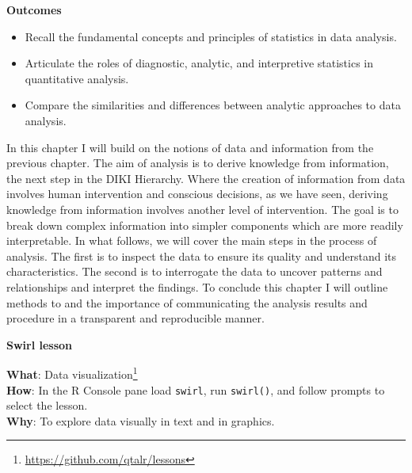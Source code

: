\documentclass[
  letterpaper,
  DIV=11,
  numbers=noendperiod]{scrreport}
\providecommand{\tightlist}{%
  \setlength{\itemsep}{0pt}\setlength{\parskip}{0pt}}\usepackage{longtable,booktabs,array}
\theoremstyle{definition}
\theoremstyle{remark}
\DeclareRobustCommand{\href}[2]{#2\footnote{\url{#1}}}
\begin{document}
\begin{tcolorbox}[enhanced jigsaw, opacityback=0, bottomrule=.15mm, left=2mm, breakable, colback=white, leftrule=.75mm, toprule=.15mm, rightrule=.15mm, arc=.35mm]

\textbf{ Outcomes}

\begin{itemize}
\tightlist
\item
  Recall the fundamental concepts and principles of statistics in data
  analysis.
\item
  Articulate the roles of diagnostic, analytic, and interpretive
  statistics in quantitative analysis.
\item
  Compare the similarities and differences between analytic approaches
  to data analysis.
\end{itemize}

\end{tcolorbox}

In this chapter I will build on the notions of data and information from
the previous chapter. The aim of analysis is to derive knowledge from
information, the next step in the DIKI Hierarchy. Where the creation of
information from data involves human intervention and conscious
decisions, as we have seen, deriving knowledge from information involves
another level of intervention. The goal is to break down complex
information into simpler components which are more readily
interpretable. In what follows, we will cover the main steps in the
process of analysis. The first is to inspect the data to ensure its
quality and understand its characteristics. The second is to interrogate
the data to uncover patterns and relationships and interpret the
findings. To conclude this chapter I will outline methods to and the
importance of communicating the analysis results and procedure in a
transparent and reproducible manner.

\begin{tcolorbox}[enhanced jigsaw, opacityback=0, bottomrule=.15mm, left=2mm, breakable, colback=white, leftrule=.75mm, toprule=.15mm, rightrule=.15mm, arc=.35mm]

\textbf{ Swirl lesson}

\textbf{What}: \href{https://github.com/qtalr/lessons}{Data
visualization}\\
\textbf{How}: In the R Console pane load \texttt{swirl}, run
\texttt{swirl()}, and follow prompts to select the lesson.\\
\textbf{Why}: To explore data visually in text and in graphics.

\end{tcolorbox}
\end{document}
